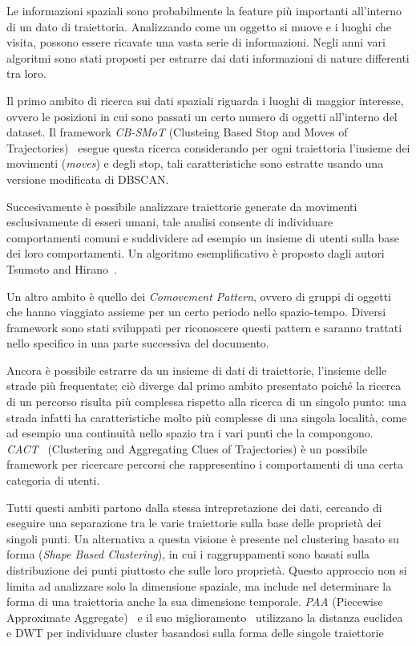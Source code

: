 Le informazioni spaziali sono probabilmente la feature più importanti all'interno di un dato di traiettoria.
Analizzando come un oggetto si muove e i luoghi che visita, possono essere ricavate una vasta serie di informazioni.
Negli anni vari algoritmi sono stati proposti per estrarre dai dati informazioni di nature differenti tra loro.

Il primo ambito di ricerca sui dati spaziali riguarda i luoghi di maggior interesse, ovvero le posizioni
in cui sono passati un certo numero di oggetti all'interno del dataset.
Il framework \textit{CB-SMoT} (Clusteing Based Stop and Moves of Trajectories)~\cite{palma2008clustering} esegue questa
ricerca considerando per ogni traiettoria l'insieme dei movimenti (\textit{moves}) e degli stop, tali
caratteristiche sono estratte usando una versione modificata di DBSCAN\@.

Succesivamente è possibile analizzare traiettorie generate da movimenti esclusivamente di esseri umani,
tale analisi consente di individuare comportamenti comuni e suddividere ad esempio un insieme di
utenti sulla base dei loro comportamenti.
Un algoritmo esemplificativo è proposto dagli autori Tsumoto and Hirano~\cite{tsumoto2009behavior}.

Un altro ambito è quello dei \textit{Comovement Pattern}, ovvero di
gruppi di oggetti che hanno viaggiato assieme per un certo periodo nello spazio-tempo.
Diversi framework sono stati sviluppati per riconoscere questi pattern e saranno trattati nello
specifico in una parte successiva del documento.

Ancora è possibile estrarre da un insieme di dati di traiettorie, l'insieme delle strade più
frequentate; ciò diverge dal primo ambito presentato poiché la ricerca di un percorso risulta
più complessa rispetto alla ricerca di un singolo punto: una strada infatti ha caratteristiche molto
più complesse di una singola località, come ad esempio una continuità nello spazio tra i vari punti che
la compongono.
\textit{CACT}~\cite{hung2015clustering} (Clustering and Aggregating Clues of Trajectories) è un possibile framework per
ricercare percorsi che rappresentino i comportamenti di una certa categoria di utenti.

Tutti questi ambiti partono dalla stessa intrepretazione dei dati, cercando di eseguire una separazione
tra le varie traiettorie sulla base delle proprietà dei singoli punti.
Un alternativa a questa visione è presente nel clustering basato su forma (\textit{Shape Based Clustering}),
in cui i raggruppamenti sono basati sulla distribuzione dei punti piuttosto che sulle loro proprietà.
Questo approccio non si limita ad analizzare solo la dimensione spaziale, ma include nel determinare la
forma di una traiettoria anche la sua dimensione temporale.
\textit{PAA} (Piecewise Approximate Aggregate)~\cite{yanagisawa2003shape} e il suo miglioramento~\cite{yanagisawa2006clustering}
utilizzano la distanza euclidea e DWT per individuare cluster basandosi sulla forma delle singole traiettorie
